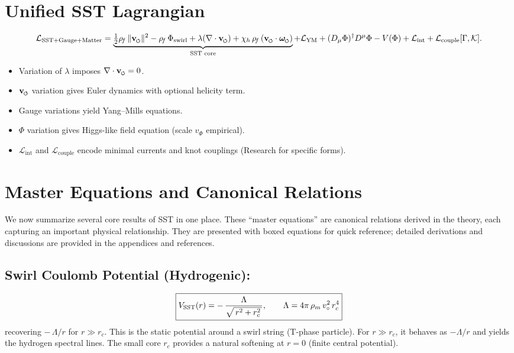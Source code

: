 \documentclass[reprint,aps,onecolumn,nofootinbib]{revtex4-2}
\newcommand{\swirlarrow}{%
    \mathchoice{\mkern-2mu\scriptstyle\boldsymbol{\circlearrowleft}}%
    {\mkern-2mu\scriptstyle\boldsymbol{\circlearrowleft}}%
    {\mkern-2mu\scriptscriptstyle\boldsymbol{\circlearrowleft}}%
    {\mkern-2mu\scriptscriptstyle\boldsymbol{\circlearrowleft}}%
}
\newcommand{\vswirl}{\mathbf{v}_{\swirlarrow}}
\newcommand{\omegas}{\boldsymbol{\omega}_{\swirlarrow}}  %
\newcommand{\rhof}{\rho_{\!f}}                           %
\begin{document}
    \section{Unified SST Lagrangian}\label{canon58:lagrangian}
    \[
        \mathcal{L}_{\rm SST+Gauge+Matter}=
        \underbrace{\tfrac12\rhof\,\|\vswirl\|^2-\rhof\,\Phi_{\text{swirl}}+\lambda(\nabla\cdot\vswirl)+\chi_h\,\rhof\,(\vswirl\cdot\omegas)}_{\text{SST core}}+
        \mathcal{L}_{\text{YM}}+(D_\mu\Phi)^\dagger D^\mu\Phi-V(\Phi)+\mathcal{L}_{\text{int}}+\mathcal{L}_{\text{couple}}[\Gamma,\mathcal K].
    \]
    \begin{itemize}
    \item Variation of $\lambda$ imposes $\nabla\cdot\vswirl=0$.
    \item $\vswirl$ variation gives Euler dynamics with optional helicity term.
    \item Gauge variations yield Yang--Mills equations.
    \item $\Phi$ variation gives Higgs-like field equation (scale $v_\Phi$ empirical).
    \item $\mathcal{L}_{\text{int}}$ and $\mathcal{L}_{\text{couple}}$ encode minimal currents and knot couplings (Research for specific forms).
    \end{itemize}


    \section{Master Equations and Canonical Relations}
        We now summarize several core results of SST in one place. These “master equations” are canonical relations derived in the theory, each capturing an important physical relationship. They are presented with boxed equations for quick reference; detailed derivations and discussions are provided in the appendices and references.

        \subsection{Swirl Coulomb Potential (Hydrogenic):}
            \[
                \boxed{%
                    V_{\text{SST}}(r) = -\,\frac{\Lambda}{\sqrt{\,r^2 + r_c^2\,}}, \qquad
                    \Lambda = 4\pi\,\rho_m\,v_{\circ}^2\,r_c^4
                }
            \]
            recovering $-\,\Lambda/r$ for $r \gg r_c$. This is the static potential around a swirl string (T-phase particle). For $r \gg r_c$, it behaves as $-\Lambda/r$ and yields the hydrogen spectral lines. The small core $r_c$ provides a natural softening at $r=0$ (finite central potential).
\end{document}

